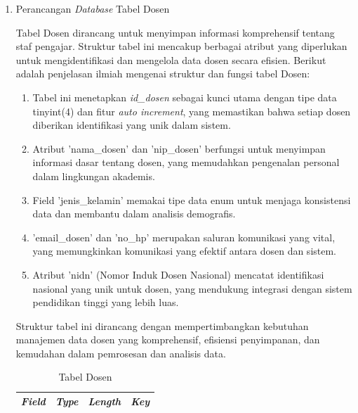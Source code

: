 \begin{enumerate}

	\item Perancangan \textit{Database} Tabel Dosen

	      Tabel Dosen dirancang untuk menyimpan informasi komprehensif tentang staf pengajar. Struktur tabel ini mencakup berbagai atribut yang diperlukan untuk mengidentifikasi dan mengelola data dosen secara efisien. Berikut adalah penjelasan ilmiah mengenai struktur dan fungsi tabel Dosen:

	      \begin{enumerate}[label=\alph*.]
		      \item Tabel ini menetapkan \textit{id\_dosen} sebagai kunci utama dengan tipe data tinyint(4) dan fitur \textit{auto increment}, yang memastikan bahwa setiap dosen diberikan identifikasi yang unik dalam sistem.
		      \item Atribut 'nama\_dosen' dan 'nip\_dosen' berfungsi untuk menyimpan informasi dasar tentang dosen, yang memudahkan pengenalan personal dalam lingkungan akademis.
		      \item Field 'jenis\_kelamin' memakai tipe data enum untuk menjaga konsistensi data dan membantu dalam analisis demografis.
		      \item 'email\_dosen' dan 'no\_hp' merupakan saluran komunikasi yang vital, yang memungkinkan komunikasi yang efektif antara dosen dan sistem.
		      \item Atribut 'nidn' (Nomor Induk Dosen Nasional) mencatat identifikasi nasional yang unik untuk dosen, yang mendukung integrasi dengan sistem pendidikan tinggi yang lebih luas.
	      \end{enumerate}

	      Struktur tabel ini dirancang dengan mempertimbangkan kebutuhan manajemen data dosen yang komprehensif, efisiensi penyimpanan, dan kemudahan dalam pemrosesan dan analisis data.

		      {
			      \fontsize{10}{12}\selectfont
			      \begin{longtable}{l l l l}
				      \caption{Tabel Dosen}
				      \label{admin}                                                                                               \\
				      \hline
				      \textbf{\textit{Field}} & \textbf{\textit{Type}} & \textbf{\textit{Length}}   & \textbf{\textit{Key}}       \\
				      \hline
				      \endfirsthead


\end{longtable}}
\end{enumerate}
